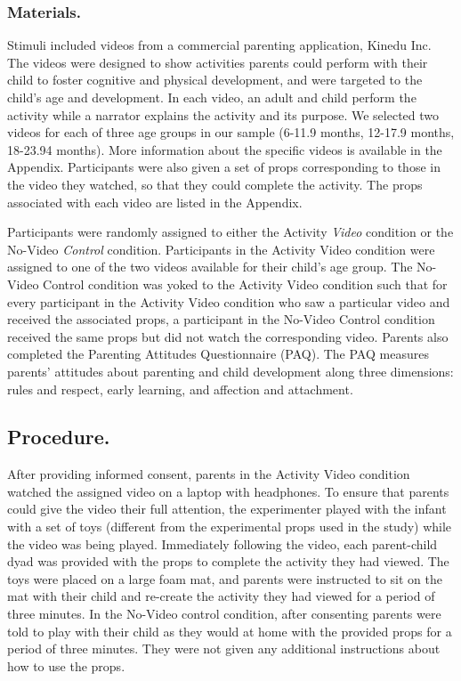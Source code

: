 \documentclass[10pt, letterpaper]{article}
\begin{document}
\subsubsection{Materials.}\label{materials.}

Stimuli included videos from a commercial parenting application, Kinedu
Inc. The videos were designed to show activities parents could perform
with their child to foster cognitive and physical development, and were
targeted to the child's age and development. In each video, an adult and
child perform the activity while a narrator explains the activity and
its purpose. We selected two videos for each of three age groups in our
sample (6-11.9 months, 12-17.9 months, 18-23.94 months). More
information about the specific videos is available in the Appendix.
Participants were also given a set of props corresponding to those in
the video they watched, so that they could complete the activity. The
props associated with each video are listed in the Appendix.

Participants were randomly assigned to either the Activity \emph{Video}
condition or the No-Video \emph{Control} condition. Participants in the
Activity Video condition were assigned to one of the two videos
available for their child's age group. The No-Video Control condition
was yoked to the Activity Video condition such that for every
participant in the Activity Video condition who saw a particular video
and received the associated props, a participant in the No-Video Control
condition received the same props but did not watch the corresponding
video. Parents also completed the Parenting Attitudes Questionnaire
(PAQ). The PAQ measures parents' attitudes about parenting and child
development along three dimensions: rules and respect, early learning,
and affection and attachment.

\subsection{Procedure.}\label{procedure.}

After providing informed consent, parents in the Activity Video
condition watched the assigned video on a laptop with headphones. To
ensure that parents could give the video their full attention, the
experimenter played with the infant with a set of toys (different from
the experimental props used in the study) while the video was being
played. Immediately following the video, each parent-child dyad was
provided with the props to complete the activity they had viewed. The
toys were placed on a large foam mat, and parents were instructed to sit
on the mat with their child and re-create the activity they had viewed
for a period of three minutes. In the No-Video control condition, after
consenting parents were told to play with their child as they would at
home with the provided props for a period of three minutes. They were
not given any additional instructions about how to use the props.
\end{document}
